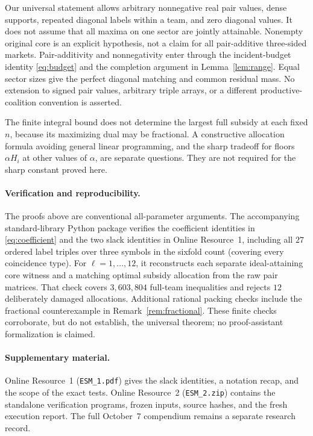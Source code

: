 \documentclass[11pt]{article}
\theoremstyle{remark}
\begin{document}
Our universal statement allows arbitrary nonnegative real pair values,
dense supports, repeated diagonal labels within a team, and zero diagonal
values. It does not assume that all maxima on one sector are jointly
attainable. Nonempty original core is an explicit hypothesis, not a
claim for all pair-additive three-sided markets. Pair-additivity and
nonnegativity enter through the incident-budget identity
\eqref{eq:budget} and the completion argument in Lemma~\ref{lem:range}.
Equal sector sizes give the perfect diagonal matching and common residual
mass. No extension to signed pair values, arbitrary triple arrays, or a
different productive-coalition convention is asserted.

The finite integral bound does not determine the largest full subsidy at
each fixed $n$, because its maximizing dual may be fractional. A constructive
allocation formula avoiding general linear programming, and the sharp
tradeoff for floors $\alpha H_i$ at other values of $\alpha$, are separate
questions. They are not required for the sharp constant proved here.

\paragraph{Verification and reproducibility.}
The proofs above are conventional all-parameter arguments. The accompanying
standard-library Python package verifies the coefficient identities in
\eqref{eq:coefficient} and the two slack identities in Online Resource~1,
including all $27$ ordered label triples over three symbols in the sixfold
count (covering every coincidence type).
For $\ell=1,\ldots,12$, it reconstructs each separate ideal-attaining
core witness and a matching optimal subsidy allocation from the raw pair
matrices. That check covers $3{,}603{,}804$ full-team inequalities and rejects
$12$ deliberately damaged allocations. Additional rational packing checks
include the fractional counterexample in Remark~\ref{rem:fractional}.
These finite checks corroborate, but do not establish, the universal theorem;
no proof-assistant formalization is claimed.

\paragraph{Supplementary material.}
Online Resource~1 (\texttt{ESM\_1.pdf}) gives the slack identities, a notation
recap, and the scope of the exact tests. Online Resource~2
(\texttt{ESM\_2.zip}) contains the standalone verification programs, frozen
inputs, source hashes, and the fresh execution report. The full October~7
compendium remains a separate research record.
\end{document}
